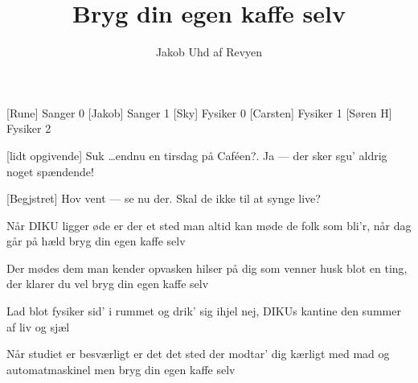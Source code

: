 \documentclass[a4paper,11pt]{article}
\title{Bryg din egen kaffe selv}
\author{Jakob Uhd af Revyen}
\begin{document}
\maketitle

\begin{roles}
  [Rune] Sanger 0
  [Jakob] Sanger 1
  [Sky] Fysiker 0
  [Carsten] Fysiker 1
  [Søren H] Fysiker 2
\end{roles}



\begin{sketch}
  [lidt opgivende] Suk \ldots endnu en tirsdag på Caf\'een?.
   Ja --- der sker sgu' aldrig noget spændende!
  
  
  [Begjstret] Hov vent  --- se nu der. Skal
  de ikke til at synge  live?
\end{sketch}

\begin{song}
  
  Når DIKU ligger øde
  er der et sted man altid kan møde
  de folk som bli'r, når dag går på hæld
  bryg din egen kaffe selv

  Der mødes dem man kender
  opvasken hilser på dig som venner
  husk blot en ting, der klarer du vel
  bryg din egen kaffe selv

  Lad blot fysiker sid' i rummet
  og drik' sig ihjel
  nej, DIKUs kantine den summer
  af liv og sjæl

  Når studiet er besværligt
  er det det sted der modtar' dig kærligt
  med mad og automatmaskinel
  men bryg din egen kaffe selv
  
\end{song}

\begin{sketch}
   
   
\end{sketch}
\end{document}

